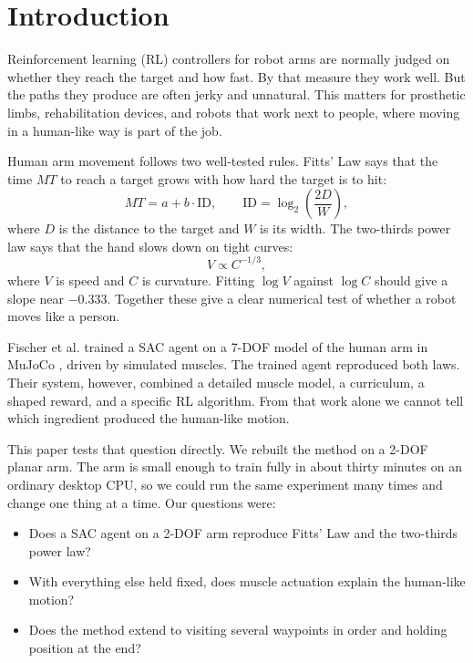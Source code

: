 \documentclass[conference]{IEEEtran}
\begin{document}
\section{Introduction}

Reinforcement learning (RL) controllers for robot arms are normally judged on
whether they reach the target and how fast. By that measure they work well. But
the paths they produce are often jerky and unnatural. This matters for
prosthetic limbs, rehabilitation devices, and robots that work next to people,
where moving in a human-like way is part of the job.

Human arm movement follows two well-tested rules. Fitts' Law \cite{fitts1954}
says that the time $MT$ to reach a target grows with how hard the target is to
hit:
\begin{equation}
MT = a + b \cdot \mathrm{ID}, \qquad
\mathrm{ID} = \log_2\!\left(\frac{2D}{W}\right),
\label{eq:fitts}
\end{equation}
where $D$ is the distance to the target and $W$ is its width. The two-thirds
power law \cite{lacquaniti1983} says that the hand slows down on tight curves:
\begin{equation}
V \propto C^{-1/3},
\label{eq:power}
\end{equation}
where $V$ is speed and $C$ is curvature. Fitting $\log V$ against $\log C$
should give a slope near $-0.333$. Together these give a clear numerical test
of whether a robot moves like a person.

Fischer et al. \cite{fischer2021} trained a SAC agent on a 7-DOF model of the
human arm in MuJoCo \cite{todorov2012}, driven by simulated muscles. The
trained agent reproduced both laws. Their system, however, combined a detailed
muscle model, a curriculum, a shaped reward, and a specific RL algorithm. From
that work alone we cannot tell which ingredient produced the human-like motion.

This paper tests that question directly. We rebuilt the method on a 2-DOF
planar arm. The arm is small enough to train fully in about thirty minutes on
an ordinary desktop CPU, so we could run the same experiment many times and
change one thing at a time. Our questions were:

\begin{itemize}
\item[\textbf{RQ1.}] Does a SAC agent on a 2-DOF arm reproduce Fitts' Law and
the two-thirds power law?
\item[\textbf{RQ2.}] With everything else held fixed, does muscle actuation
explain the human-like motion?
\item[\textbf{RQ3.}] Does the method extend to visiting several waypoints in
order and holding position at the end?
\end{itemize}
\end{document}
